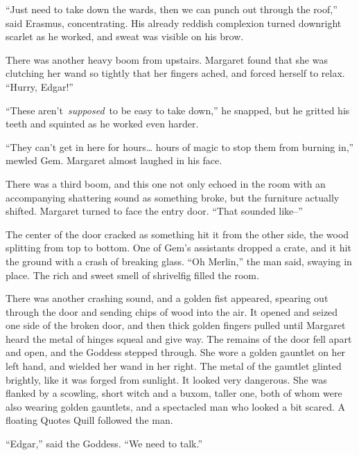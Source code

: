 ``Just need to take down the wards, then we can punch out through the
roof,'' said Erasmus, concentrating. His already reddish complexion
turned downright scarlet as he worked, and sweat was visible on his
brow.

There was another heavy boom from upstairs. Margaret found that she was
clutching her wand so tightly that her fingers ached, and forced herself
to relax. ``Hurry, Edgar!''

``These aren't~\emph{supposed}~to be easy to take down,'' he snapped,
but he gritted his teeth and squinted as he worked even harder.

``They can't get in here for hours\ldots{} hours of magic to stop them
from burning in,'' mewled Gem. Margaret almost laughed in his face.

There was a third boom, and this one not only echoed in the room with an
accompanying shattering sound as something broke, but the furniture
actually shifted. Margaret turned to face the entry door. ``That sounded
like--''

The center of the door cracked as something hit it from the other side,
the wood splitting from top to bottom. One of Gem's assistants dropped a
crate, and it hit the ground with a crash of breaking glass. ``Oh
Merlin,'' the man said, swaying in place. The rich and sweet smell of
shrivelfig filled the room.

There was another crashing sound, and a golden fist appeared, spearing
out through the door and sending chips of wood into the air. It opened
and seized one side of the broken door, and then thick golden fingers
pulled until Margaret heard the metal of hinges squeal and give way. The
remains of the door fell apart and open, and the Goddess stepped
through. She wore a golden gauntlet on her left hand, and wielded her
wand in her right. The metal of the gauntlet glinted brightly, like it
was forged from sunlight. It looked very dangerous. She was flanked by a
scowling, short witch and a buxom, taller one, both of whom were also
wearing golden gauntlets, and a spectacled man who looked a bit scared.
A floating Quotes Quill followed the man.

``Edgar,'' said the Goddess. ``We need to talk.''
